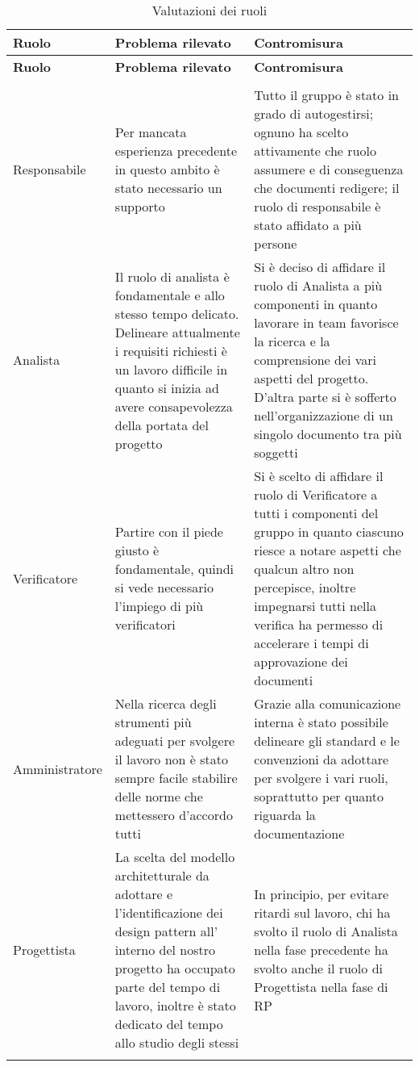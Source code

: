 \documentclass[../piano_di_qualifica.tex]{subfiles}
\begin{document}
\begin{center}
	\begin{longtable}{|p{2.5cm}|p{7cm}|p{7cm}|}
		\hline
		\rowcolor{lightgray}
		{\textbf{Ruolo}} & {\textbf{Problema rilevato}} & {\textbf{Contromisura}} \\
		\hline
		\endfirsthead
		\hline
		\rowcolor{lightgray}
		{\textbf{Ruolo}} & {\textbf{Problema rilevato}} & {\textbf{Contromisura}} \\
		\hline
		\endhead

		\hline
		\rowcolor{white}
		\multicolumn{3}{|c|}{\emph{Continua alla pagina successiva...}} \\
		\hline
		\endfoot
		\endlastfoot

		Responsabile & Per mancata esperienza precedente in questo ambito è stato necessario un supporto & Tutto il gruppo è stato in grado di autogestirsi; ognuno ha scelto attivamente che ruolo assumere e di conseguenza che documenti redigere; il ruolo di responsabile è stato affidato a più persone \\
		Analista & Il ruolo di analista è fondamentale e allo stesso tempo delicato. Delineare attualmente i requisiti richiesti è un lavoro difficile in quanto si inizia ad avere consapevolezza della portata del progetto & Si è deciso di affidare il ruolo di Analista a più componenti in quanto lavorare in team favorisce la ricerca e la comprensione dei vari aspetti del progetto. D'altra parte si è sofferto nell'organizzazione di un singolo documento tra più soggetti \\
		Verificatore & Partire con il piede giusto è fondamentale, quindi si vede necessario l'impiego di più verificatori & Si è scelto di affidare il ruolo di Verificatore a tutti i componenti del gruppo in quanto ciascuno riesce a notare aspetti che qualcun altro non percepisce, inoltre impegnarsi tutti nella verifica ha permesso di accelerare i tempi di approvazione dei documenti \\
		Amministratore & Nella ricerca degli strumenti più adeguati per svolgere il lavoro non è stato sempre facile stabilire delle norme che mettessero d'accordo tutti & Grazie alla comunicazione interna è stato possibile delineare gli standard e le convenzioni da adottare per svolgere i vari ruoli, soprattutto per quanto riguarda la documentazione \\
		Progettista & La scelta del modello architetturale da adottare e l'identificazione dei design pattern all' interno del nostro progetto ha occupato parte del tempo di lavoro, inoltre è stato dedicato del tempo allo studio degli stessi & In principio, per evitare ritardi sul lavoro, chi ha svolto il ruolo di Analista nella fase precedente ha svolto anche il ruolo di Progettista nella fase di RP \\

		\hline
		\rowcolor{white}
		\caption{Valutazioni dei ruoli}
	\end{longtable}
\end{center}
\end{document}

